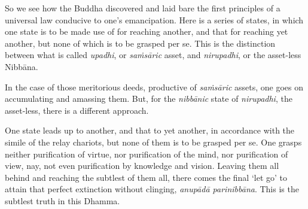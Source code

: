 So we see how the Buddha discovered and laid bare the first principles of a universal law conducive to one's emancipation. Here is a series of states, in which one state is to be made use of for reaching another, and that for reaching yet another, but none of which is to be grasped per se. This is the distinction between what is called \emph{upadhi}, or \emph{saṁsāric} asset, and \emph{nirupadhi}, or the asset-less Nibbāna.

In the case of those meritorious deeds, productive of \emph{saṁsāric} assets, one goes on accumulating and amassing them. But, for the \emph{nibbānic} state of \emph{nirupadhi}, the asset-less, there is a different approach.

One state leads up to another, and that to yet another, in accordance with the simile of the relay chariots, but none of them is to be grasped per se. One grasps neither purification of virtue, nor purification of the mind, nor purification of view, nay, not even purification by knowledge and vision. Leaving them all behind and reaching the subtlest of them all, there comes the final `let go' to attain that perfect extinction without clinging, \emph{anupādā parinibbāna}. This is the subtlest truth in this Dhamma.
